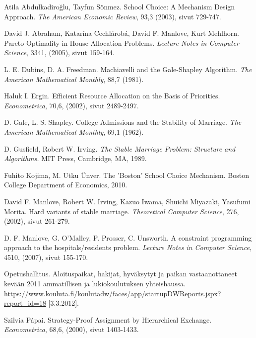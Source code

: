 \documentclass[twoside]{tktltiki}
\begin{document}
\newpage
\begin{thebibliography}{XXX99}

  Atila Abdulkadiroğlu, Tayfun Sönmez.
  School Choice: A Mechanism Design Approach.
  \emph{The American Economic Review}, 93,3 (2003), sivut 729-747.

  David J. Abraham, Katarína Cechlárobá, David F. Manlove, Kurt
  Mehlhorn.
  Pareto Optimality in House Allocation Problems.
  \emph{Lecture Notes in Computer Science}, 3341, (2005), sivut 159-164.

  L. E. Dubins, D. A. Freedman.
  Machiavelli and the Gale-Shapley Algorithm.
  \emph{The American Mathematical Monthly}, 88,7 (1981).

  Haluk I. Ergin.
  Efficient Resource Allocation on the Basis of Priorities.
  \emph{Econometrica}, 70,6, (2002), sivut 2489-2497.

  D. Gale, L. S. Shapley.
  College Admissions and the Stability of Marriage.
  \emph{The American Mathematical Monthly}, 69,1 (1962).

  D. Gusfield, Robert W. Irving.
  \emph{The Stable Marriage Problem: Structure and Algorithms.}
  MIT Press, Cambridge, MA, 1989.

  Fuhito Kojima, M. Utku Ünver.
  The 'Boston' School Choice Mechanism.
  Boston College Department of Economics, 2010.

  David F. Manlove, Robert W. Irving, Kazuo Iwama, Shuichi Miyazaki,
  Yasufumi Morita.
  Hard variants of stable marriage.
  \emph{Theoretical Computer Science}, 276, (2002), sivut 261-279.

  D. F. Manlove, G. O'Malley, P. Prosser, C. Unsworth.
  A constraint programming approach to the hospitals/residents
  problem.
  \emph{Lecture Notes in Computer Science}, 4510, (2007), sivut 155-170.

  Opetushallitus.
  Aloituspaikat, hakijat, hyväksytyt ja paikan vastaanottaneet
  kevään 2011 ammatillisen ja lukiokoulutuksen yhteishaussa.\\
  \url{https://www.kouluta.fi/koulutadw/faces/app/startupDWReports.jspx?report_id=18}
  [3.3.2012].

  Szilvia Pápai.
  Strategy-Proof Assignment by Hierarchical Exchange.
  \emph{Econometrica}, 68,6, (2000), sivut 1403-1433.


\end{thebibliography}
\end{document}
